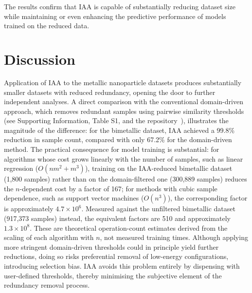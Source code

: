 \documentclass{WileyMSP-template}
\newcommand{\revision}[1]{{\color{red}#1}}
\begin{document}
The results confirm that IAA is capable of substantially reducing dataset size while maintaining or even enhancing the predictive performance of models trained on the reduced data.



\section{Discussion}
\label{sec:discussion}

Application of IAA to the metallic nanoparticle datasets produces substantially smaller datasets with reduced redundancy, opening the door to further independent analyses. A direct comparison with the conventional domain-driven approach, which removes redundant samples using pairwise similarity thresholds (see Supporting Information, Table S1, and the repository~\cite{SuppInfo}), illustrates the magnitude of the difference: for the bimetallic dataset, IAA achieved a 99.8\% reduction in sample count, compared with only 67.2\% for the domain-driven method. The practical consequence for model training is \revision{substantial: for algorithms whose cost grows linearly with the number of samples, such as linear regression ($O(nm^2+m^3)$), training on the IAA-reduced bimetallic dataset (1,800 samples) rather than on the domain-filtered one (300,889 samples) reduces the $n$-dependent cost by a factor of 167; for methods with cubic sample dependence, such as support vector machines ($O(n^3)$), the corresponding factor is approximately $4.7 \times 10^{6}$. Measured against the unfiltered bimetallic dataset (917,373 samples) instead, the equivalent factors are 510 and approximately $1.3 \times 10^{8}$. These are theoretical operation-count estimates derived from the scaling of each algorithm with $n$, not measured training times.} Although applying more stringent domain-driven thresholds could in principle yield further reductions, doing so risks preferential removal of low-energy configurations, introducing selection bias. IAA avoids this problem entirely by dispensing with user-defined thresholds, thereby minimising the subjective element of the redundancy removal process.
\end{document}
